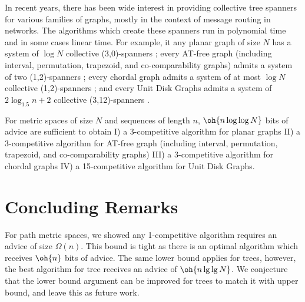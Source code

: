 In recent years, there has been wide interest in providing collective tree spanners for various families of graphs, mostly in the context of message routing in networks. The algorithms which create these spanners run in polynomial time and in some cases linear time. For example, it any planar graph of size $N$ has a system of $\log N$ collective (3,0)-spanners \cite{pezdisp}; every AT-free graph (including interval, permutation, trapezoid, and co-comparability graphs) admits a system of two (1,2)-spanners \cite{WG04}; every chordal graph admits a system of at most $\log N$ collective (1,2)-spanners \cite{SWAT04}; and every Unit Disk Graphs admits a system of $2 \log _{1.5} n +2$ collective (3,12)-spanners \cite{DUGSPANNER}. 

\begin{coro}
For metric spaces of size $N$ and sequences of length $n$, $\oh{n \log \log N}$ bits of advice are sufficient to obtain I) a 3-competitive algorithm for planar graphs 
II) a 3-competitive algorithm for AT-free graph (including interval, permutation, trapezoid, and co-comparability graphs)
III) a 3-competitive algorithm for chordal graphs 
IV) a 15-competitive algorithm for Unit Disk Graphs.
\end{coro}

\section*{Concluding Remarks}
For path metric spaces, we showed any 1-competitive algorithm requires an advice of size $\Omega(n)$. This bound is tight as there is an optimal algorithm \cite{WAOA11} which receives $\oh{n}$ bits of advice.
The same lower bound applies for trees, however, the best algorithm for tree receives an advice of $\oh{n \lg \lg N}$. We conjecture that the lower bound argument can be improved for trees to match it with upper bound, and leave this as future work.


